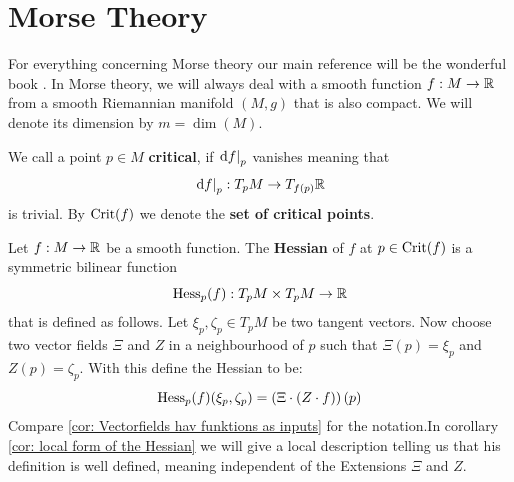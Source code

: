 \section{Morse Theory}
For everything concerning Morse theory our main reference will be the wonderful book \cite{banyaga2004lectures}. 
In Morse theory, we will always deal with a smooth function $f:M\to \mathbb{R}$ from a smooth Riemannian manifold $(M,g)$ that is also compact. We will denote its dimension by $m=\dim (M)$.
\begin{definition}
	We call a point $p\in M$ \textbf{critical}, if $\left.\mathop{}\!\mathrm{d} f\right|_{p}$ vanishes meaning that 
	\begin{equation*}
		\left.\mathop{}\!\mathrm{d} f\right|_{p} :T_pM\to T_{f(p)}\mathbb{R}
	\end{equation*} is trivial. By $\mathrm{Crit} (f)$ we denote the \textbf{set of critical points}.
\end{definition}
\begin{definition}
Let $f:M\to \mathbb{R}$ be a smooth function. The \textbf{Hessian} of $f$ at $p\in \mathrm{Crit}(f)$ is a symmetric bilinear function
\begin{equation*}
	\operatorname{\mathrm{Hess}}_p(f):T_pM\times T_pM \to \mathbb{R}
\end{equation*}  that is defined as follows. Let $\xi_p, \zeta_p\in T_pM$ be two tangent vectors. Now choose two vector fields $\Xi$ and $Z$ in a neighbourhood of $p$ such that $\Xi(p)=\xi_p$ and $Z(p)=\zeta_p$. With this define the Hessian to be: 
\begin{equation*}
	\operatorname{\mathrm{Hess}}_p(f)(\xi_p,\zeta_p)=\left(\Xi\cdot (Z\cdot f)\right)(p)
\end{equation*} Compare \ref{cor: Vectorfields hav funktions as inputs} for the notation.In corollary \ref{cor: local form of the Hessian} we will give a local description telling us that his definition is well defined, meaning independent of the Extensions $\Xi$ and $Z$.  
\end{definition}







